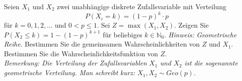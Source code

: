 \begin{Exercise}
	Seien $X_1$ und $X_2$ zwei unabhängige diskrete Zufallsvariable mit Verteilung
	\begin{equation*}
		P(X_i=k)=(1-p)^k\cdot p
	\end{equation*}
	für $k=0,1,2,\dots$ und $0< p\leq 1$. Sei $Z=\max(X_1,X_2)$.
	\Question Zeigen Sie $P(X_2\leq k)=1-(1-p)^{k+1}$ für beliebiges $k\in\mathbb{N}_0$. \textit{Hinweis: Geometrische Reihe.}
	\Question Bestimmen Sie die gemeinsamen Wahrscheinlichkeiten von $Z$ und $X_1$.
	\Question Bestimmen Sie die Wahrscheinlichkeitsfunktion von $Z$.\\
	\textit{Bemerkung: Die Verteilung der Zufallsvariablen $X_1$ und $X_2$ ist die sogenannte geometrische Verteilung. Man schreibt kurz: $X_1,X_2\sim Geo(p)$.}
\end{Exercise}

